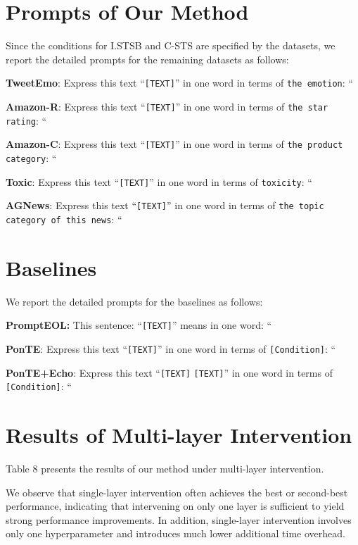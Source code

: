 \documentclass[11pt]{article}
\begin{document}
\section{Prompts of Our Method} \label{app:prompt}
Since the conditions for I.STSB and C-STS are specified by the datasets, we report the detailed prompts for the remaining datasets as follows:
\begin{tcolorbox}
\textbf{TweetEmo}: 
Express this text ``\texttt{[TEXT]}'' in one word in terms of \texttt{the emotion}: ``

\textbf{Amazon-R}: 
Express this text ``\texttt{[TEXT]}'' in one word in terms of \texttt{the star rating}: ``

\textbf{Amazon-C}: 
Express this text ``\texttt{[TEXT]}'' in one word in terms of \texttt{the product category}: ``

\textbf{Toxic}: 
Express this text ``\texttt{[TEXT]}'' in one word in terms of \texttt{toxicity}: ``

\textbf{AGNews}: 
Express this text ``\texttt{[TEXT]}'' in one word in terms of \texttt{the topic category of this news}: ``

\end{tcolorbox}

\section{Baselines} \label{app:baseline}
We report the detailed prompts for the baselines as follows:
\begin{tcolorbox}
\textbf{PromptEOL:}  
This sentence: ``\texttt{[TEXT]}'' means in one word: ``

\textbf{PonTE}: 
Express this text ``\texttt{[TEXT]}'' in one word in terms of \texttt{[Condition]}: ``

\textbf{PonTE+Echo}: 
Express this text ``\texttt{[TEXT]} \texttt{[TEXT]}'' in one word in terms of \texttt{[Condition]}: ``

\end{tcolorbox}

\section{Results of Multi-layer Intervention}
Table 8 presents the results of our method under multi-layer intervention.

We observe that single-layer intervention often achieves the best or second-best performance, indicating that intervening on only one layer is sufficient to yield strong performance improvements.
In addition, single-layer intervention involves only one hyperparameter and introduces much lower additional time overhead.
\end{document}
